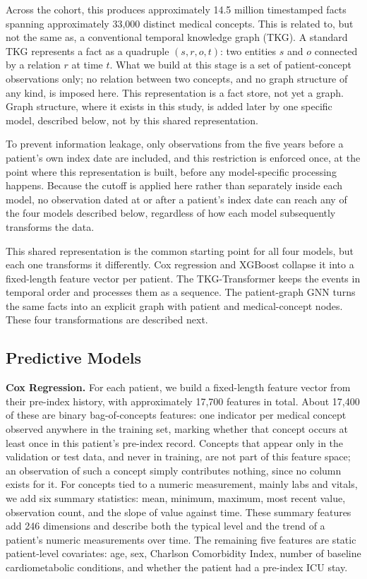 Across the cohort, this produces approximately 14.5 million timestamped facts spanning approximately 33{,}000 distinct medical concepts. This is related to, but not the same as, a conventional temporal knowledge graph (TKG). A standard TKG represents a fact as a quadruple $(s, r, o, t)$: two entities $s$ and $o$ connected by a relation $r$ at time $t$. What we build at this stage is a set of patient-concept observations only; no relation between two concepts, and no graph structure of any kind, is imposed here. This representation is a fact store, not yet a graph. Graph structure, where it exists in this study, is added later by one specific model, described below, not by this shared representation.

To prevent information leakage, only observations from the five years before a patient's own index date are included, and this restriction is enforced once, at the point where this representation is built, before any model-specific processing happens. Because the cutoff is applied here rather than separately inside each model, no observation dated at or after a patient's index date can reach any of the four models described below, regardless of how each model subsequently transforms the data.

This shared representation is the common starting point for all four models, but each one transforms it differently. Cox regression and XGBoost collapse it into a fixed-length feature vector per patient. The TKG-Transformer keeps the events in temporal order and processes them as a sequence. The patient-graph GNN turns the same facts into an explicit graph with patient and medical-concept nodes. These four transformations are described next.

\subsection{Predictive Models}
\label{sec:models}

\textbf{Cox Regression.}
For each patient, we build a fixed-length feature vector from their pre-index history, with approximately 17{,}700 features in total. About 17{,}400 of these are binary bag-of-concepts features: one indicator per medical concept observed anywhere in the training set, marking whether that concept occurs at least once in this patient's pre-index record. Concepts that appear only in the validation or test data, and never in training, are not part of this feature space; an observation of such a concept simply contributes nothing, since no column exists for it. For concepts tied to a numeric measurement, mainly labs and vitals, we add six summary statistics: mean, minimum, maximum, most recent value, observation count, and the slope of value against time. These summary features add 246 dimensions and describe both the typical level and the trend of a patient's numeric measurements over time. The remaining five features are static patient-level covariates: age, sex, Charlson Comorbidity Index, number of baseline cardiometabolic conditions, and whether the patient had a pre-index ICU stay.

